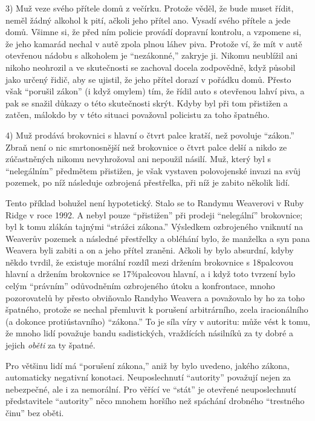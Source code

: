 \documentclass{book}
\begin{document}
3) Muž veze svého přítele domů z večírku. Protože věděl, že bude muset řídit, neměl žádný alkohol k pití, ačkoli jeho přítel ano. Vysadí svého přítele a jede domů. Všimne si, že před ním policie provádí dopravní kontrolu, a vzpomene si, že jeho kamarád nechal v autě zpola plnou láhev piva. Protože ví, že mít v autě otevřenou nádobu s alkoholem je \enquote{nezákonné,} zakryje ji. Nikomu neublížil ani nikoho neohrozil a ve skutečnosti se zachoval docela zodpovědně, když působil jako určený řidič, aby se ujistil, že jeho přítel dorazí v pořádku domů. Přesto však \enquote{porušil zákon} (i když omylem) tím, že řídil auto s otevřenou lahví piva, a pak se snažil důkazy o této skutečnosti skrýt. Kdyby byl při tom přistižen a zatčen, málokdo by v této situaci považoval policistu za toho špatného.

4) Muž prodává brokovnici s hlavní o čtvrt palce kratší, než povoluje \enquote{zákon.} Zbraň není o nic smrtonosnější než brokovnice o čtvrt palce delší a nikdo ze zúčastněných nikomu nevyhrožoval ani nepoužil násilí. Muž, který byl s \enquote{nelegálním} předmětem přistižen, je však vystaven polovojenské invazi na svůj pozemek, po níž následuje ozbrojená přestřelka, při níž je zabito několik lidí.

Tento příklad bohužel není hypotetický. Stalo se to Randymu Weaverovi v Ruby Ridge v roce 1992. A nebyl pouze \enquote{přistižen} při prodeji \enquote{nelegální} brokovnice; byl k tomu zlákán tajnými \enquote{strážci zákona.} Výsledkem ozbrojeného vniknutí na Weaverův pozemek a následné přestřelky a obléhání bylo, že manželka a syn pana Weavera byli zabiti a on a jeho přítel zraněni. Ačkoli by bylo absurdní, kdyby někdo tvrdil, že existuje morální rozdíl mezi držením brokovnice s 18palcovou hlavní a držením brokovnice se 17¾palcovou hlavní, a i když toto tvrzení bylo celým \enquote{právním} odůvodněním ozbrojeného útoku a konfrontace, mnoho pozorovatelů by přesto obviňovalo Randyho Weavera a považovalo by ho za toho špatného, protože se nechal přemluvit k porušení arbitrárního, zcela iracionálního (a dokonce protiústavního) \enquote{zákona.} To je síla víry v autoritu: může vést k tomu, že mnoho lidí považuje bandu sadistických, vraždících násilníků za ty dobré a jejich \emph{oběti} za ty špatné.

Pro většinu lidí má \enquote{porušení zákona,} aniž by bylo uvedeno, jakého zákona, automaticky negativní konotaci. Neuposlechnutí \enquote{autority} považují nejen za nebezpečné, ale i za nemorální. Pro věřící ve \enquote{stát} je otevřené neuposlechnutí představitele \enquote{autority} něco mnohem horšího než spáchání drobného \enquote{trestného činu} bez oběti.
\end{document}
